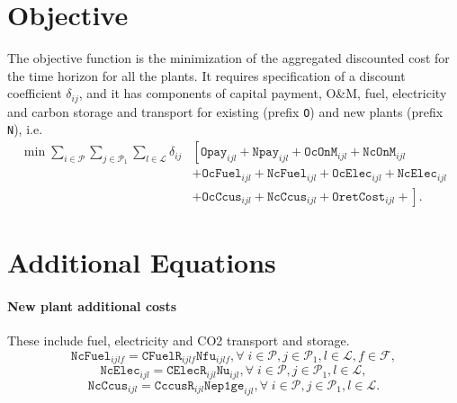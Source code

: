 \documentclass{amsbook}
\begin{document}
\section{Objective}
%
The objective function is the minimization of the aggregated discounted cost for
the time horizon for all the plants. It requires specification of a discount
coefficient $\delta_{ij}$, and it has components of capital payment, O\&M, fuel,
electricity and carbon storage and transport for existing (prefix \texttt{O})
and new plants (prefix \texttt{N}), i.e.
%
\begin{equation}
    \begin{split}
        \min \sum_{i\in \mathcal{P}}
        \sum_{j\in \mathcal{P}_1}
        \sum_{l\in \mathcal{L}}
        \delta_{ij}  
        &\left[\mathtt{Opay}_{ijl} 
        + \mathtt{Npay}_{ijl} 
        + \mathtt{OcOnM}_{ijl}
        + \mathtt{NcOnM}_{ijl} \right. \\ 
        &+ \mathtt{OcFuel}_{ijl} 
        + \mathtt{NcFuel}_{ijl} 
        + \mathtt{OcElec}_{ijl} 
        + \mathtt{NcElec}_{ijl}  \\
        &\left.+ \mathtt{OcCcus}_{ijl} 
        + \mathtt{NcCcus}_{ijl}
        + \mathtt{OretCost}_{ijl} 
        + \right].
    \end{split}
\end{equation}

%

%
\appendix
%
\section{Additional Equations}
%
\paragraph{New plant additional costs} These include fuel, electricity and CO2
transport and storage.
\begin{equation}
    \mathtt{NcFuel}_{ijlf} = \mathtt{CFuelR}_{ijlf} \mathtt{Nfu}_{ijlf},
    \forall \; i \in \mathcal{P},j \in \mathcal{P}_1 ,
    l \in \mathcal{L}, f \in \mathcal{F},
\end{equation}
%
\begin{equation}
    \mathtt{NcElec}_{ijl} = \mathtt{CElecR}_{ijl} \mathtt{Nu}_{ijl},
    \forall \; i \in \mathcal{P},j \in \mathcal{P}_1 , l \in \mathcal{L},
\end{equation}
%
\begin{equation}
    \mathtt{NcCcus}_{ijl} = \mathtt{CccusR}_{ijl} \mathtt{Nep1ge}_{ijl},
    \forall \; i \in \mathcal{P},j \in \mathcal{P}_1 , l \in \mathcal{L}.
\end{equation}
\end{document}
